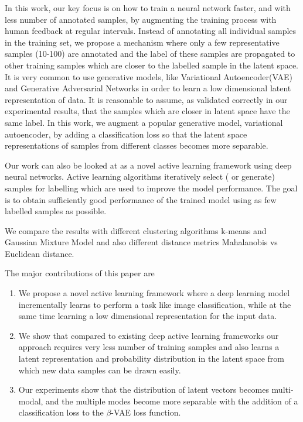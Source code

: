 \documentclass[runningheads]{llncs}
\begin{document}
In this work, our key focus is on how to train a neural network faster, and with less number of annotated samples, by augmenting the training process with human feedback at regular intervals.
Instead of annotating all individual samples in the training set, we propose a mechanism where only a few representative samples (10-100) are annotated and the label of these samples are propagated to other training samples  which are closer to the labelled sample in the latent space.
It is very common to use  generative models, like Variational Autoencoder(VAE) \cite{vae} and Generative Adversarial Networks \cite{gan} in order to learn a low dimensional latent representation of data.
It is reasonable to assume, as validated correctly in our experimental results, that the samples which are closer in latent space have the same label.
In this work, we augment a popular generative model, variational autoencoder,  by adding a classification loss so that the latent space representations of samples from different classes becomes more separable.

Our work can also be looked at  as a novel  active learning framework using deep neural networks.
Active learning algorithms iteratively select ( or generate) samples for labelling which are used to improve the model performance.
The goal is to obtain sufficiently good performance of the trained model using as few labelled samples as possible.

We compare the results with different clustering algorithms k-means and Gaussian Mixture Model and also different distance metrics Mahalanobis vs Euclidean distance.

The major contributions of this paper are
\begin{enumerate}
    \item We propose a novel active learning framework where a  deep learning model incrementally learns to perform a task like image classification, while at the same time learning a low dimensional representation for the input data.
    \item We show that compared to existing deep active learning frameworks our approach requires very less number of training samples and also learns a latent representation and  probability distribution in the latent space from which new data samples can be drawn easily.
    \item Our experiments show that the distribution of latent vectors becomes multi-modal, and the multiple modes become more separable with the addition of a classification loss to the $\beta$-VAE loss function\cite{beta_vae}.
\end{enumerate}
\end{document}
